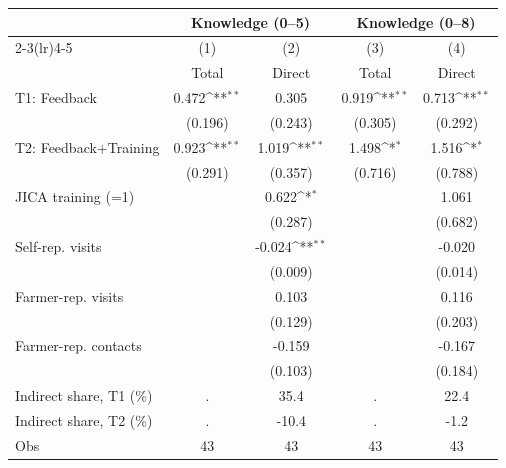 {
\def\sym#1{\ifmmode^{#1}\else\(^{#1}\)\fi}
\begin{tabular}{l*{4}{c}}
\toprule
                    &\multicolumn{2}{c}{Knowledge (0--5)}       &\multicolumn{2}{c}{Knowledge (0--8)}       \\\cmidrule(lr){2-3}\cmidrule(lr){4-5}
                    &\multicolumn{1}{c}{(1)}&\multicolumn{1}{c}{(2)}&\multicolumn{1}{c}{(3)}&\multicolumn{1}{c}{(4)}\\
                    &\multicolumn{1}{c}{Total}&\multicolumn{1}{c}{Direct}&\multicolumn{1}{c}{Total}&\multicolumn{1}{c}{Direct}\\
\midrule
T1: Feedback        &       0.472\sym{**} &       0.305         &       0.919\sym{**} &       0.713\sym{**} \\
                    &     (0.196)         &     (0.243)         &     (0.305)         &     (0.292)         \\
T2: Feedback+Training&       0.923\sym{**} &       1.019\sym{**} &       1.498\sym{*}  &       1.516\sym{*}  \\
                    &     (0.291)         &     (0.357)         &     (0.716)         &     (0.788)         \\
JICA training (=1)  &                     &       0.622\sym{*}  &                     &       1.061         \\
                    &                     &     (0.287)         &                     &     (0.682)         \\
Self-rep. visits    &                     &      -0.024\sym{**} &                     &      -0.020         \\
                    &                     &     (0.009)         &                     &     (0.014)         \\
Farmer-rep. visits  &                     &       0.103         &                     &       0.116         \\
                    &                     &     (0.129)         &                     &     (0.203)         \\
Farmer-rep. contacts&                     &      -0.159         &                     &      -0.167         \\
                    &                     &     (0.103)         &                     &     (0.184)         \\
\midrule
Indirect share, T1 (\%)&           .         &        35.4         &           .         &        22.4         \\
Indirect share, T2 (\%)&           .         &       -10.4         &           .         &        -1.2         \\
Obs                 &          43         &          43         &          43         &          43         \\
\bottomrule
\end{tabular}
}

